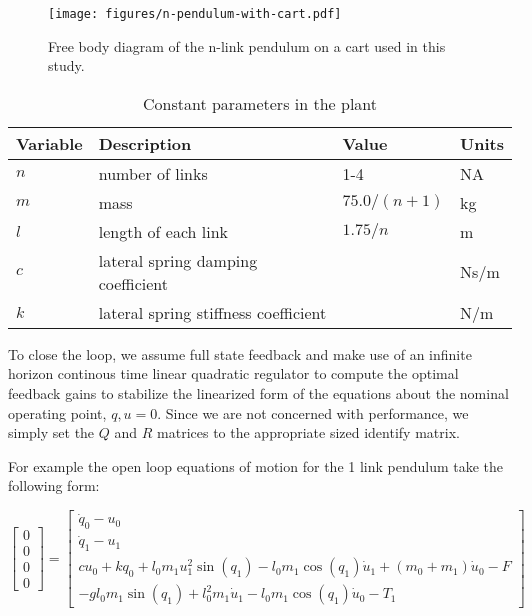 \documentclass{article}
\begin{document}

\begin{figure}
  \centering
  \texttt{[image: figures/n-pendulum-with-cart.pdf]}
  \caption{Free body diagram of the n-link pendulum on a cart used in this
    study.}
  \label{fig:free-body-diagram}
\end{figure}

\begin{table}
  \centering
  \caption{Constant parameters in the plant}
  \begin{tabular}{llll}
    \toprule
    Variable   & Description                          & Value            & Units \\
    \midrule
    $n$        & number of links                      & 1-4              & NA    \\
    $m$        & mass                                 & $75.0 / (n + 1)$ & kg    \\
    $l$        & length of each link                  & $1.75 / n$       & m     \\
    $c$        & lateral spring damping coefficient   &                  & Ns/m  \\
    $k$        & lateral spring stiffness coefficient &                  & N/m   \\
    \bottomrule
  \end{tabular}
\end{table}

To close the loop, we assume full state feedback and make use of an infinite
horizon continous time linear quadratic regulator to compute the optimal
feedback gains to stabilize the linearized form of the equations about the
nominal operating point, $q,u=0$. Since we are not concerned with performance,
we simply set the $Q$ and $R$ matrices to the appropriate sized identify
matrix.


For example the open loop equations of motion for the 1 link pendulum take the
following form:

\begin{equation}
   \begin{bmatrix}
     0 \\ 0 \\ 0 \\ 0
   \end{bmatrix}
   =
   \begin{bmatrix}
     \dot{q}_{0} - u_{0} \\
     \dot{q}_{1} - u_{1} \\ c u_{0} + k q_{0} + l_{0} m_{1} u^{2}_{1}
     \operatorname{sin}\left(q_{1}\right) - l_{0} m_{1}
     \operatorname{cos}\left(q_{1}\right) \dot{u}_{1} + \left(m_{0} +
     m_{1}\right) \dot{u}_{0} - F \\
     -g l_{0} m_{1} \operatorname{sin}\left(q_{1}\right) + l_{0}^{2} m_{1} \dot{u}_{1} - l_{0} m_{1} \operatorname{cos}\left(q_{1}\right) \dot{u}_{0} - T_{1}
   \end{bmatrix}
\end{equation}
\end{document}
